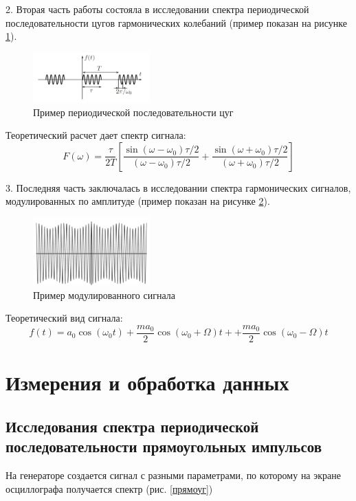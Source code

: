 \documentclass[a4paper,12pt]{article} %
\begin{document}
2. Вторая часть работы состояла в исследовании спектра периодической последовательности цугов гармонических колебаний (пример показан на рисунке \ref{цуги}). 
\begin{figure}[h!]
\begin{center}
\includegraphics[width=0.4\textwidth]{цуги}
\caption{Пример периодической последовательности цуг} \label{цуги}
\end{center}
\end{figure}
Теоретический расчет дает спектр сигнала: 
\begin{equation}
F(\omega) = \dfrac{\tau}{2T}\left[\dfrac{\sin(\omega-\omega_0)\tau /2}
{(\omega-\omega_0)\tau /2}
 + \dfrac{\sin(\omega+\omega_0)\tau /2}{(\omega+\omega_0)\tau /2}\right]
\end{equation}

3. Последняя часть заключалась в исследовании спектра гармонических сигналов, модулированных по амплитуде  (пример показан на рисунке \ref{модулированный}).
\begin{figure}[h!]
\begin{center}
\includegraphics[width=0.4\textwidth]{Модулированный}
\caption{Пример модулированного сигнала} \label{модулированный}
\end{center}
\end{figure}
Теоретический вид сигнала: 
\begin{equation}
f(t) = a_0 \cos (\omega_0 t) +\dfrac{ma_0}{2}\cos (\omega_0 +\Omega)t++\dfrac{ma_0}{2}\cos (\omega_0 -\Omega)t
\end{equation}



\section{Измерения и обработка данных}
\subsection*{Исследования спектра периодической последовательности прямоугольных импульсов}
На генераторе создается сигнал с разными параметрами, по которому на экране осциллографа получается спектр (рис. \ref{прямоуг})
\end{document}

